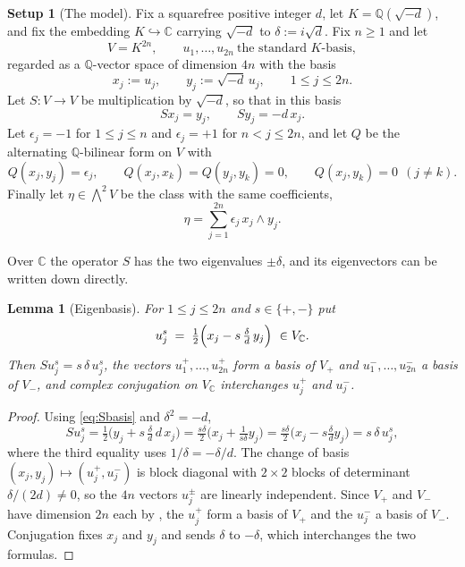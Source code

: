 \documentclass[11pt,reqno]{amsart}
\theoremstyle{plain}
\newtheorem{lemma}[theorem]{Lemma}
\theoremstyle{definition}
\newtheorem{setupenv}[theorem]{Setup}
\theoremstyle{remark}
\newcommand{\QQ}{\mathbb{Q}}
\newcommand{\CC}{\mathbb{C}}
\begin{document}
\begin{setupenv}[The model]\label{setup:model}
Fix a squarefree positive integer $d$, let $K=\QQ(\sqrt{-d})$, and fix the
embedding $K\hookrightarrow\CC$ carrying $\sqrt{-d}$ to $\delta:=i\sqrt{d}$.
Fix $n\ge1$ and let
\[
  V=K^{2n},
  \qquad
  u_{1},\dots,u_{2n}\ \text{the standard $K$-basis},
\]
regarded as a $\QQ$-vector space of dimension $4n$ with the basis
\[
  x_{j}:=u_{j},
  \qquad
  y_{j}:=\sqrt{-d}\,u_{j},
  \qquad 1\le j\le 2n .
\]
Let $S\colon V\to V$ be multiplication by $\sqrt{-d}$, so that in this basis
\begin{equation}\label{eq:Sbasis}
  S x_{j}=y_{j},
  \qquad
  S y_{j}=-d\,x_{j}.
\end{equation}
Let $\epsilon_{j}=-1$ for $1\le j\le n$ and $\epsilon_{j}=+1$ for
$n<j\le 2n$, and let $Q$ be the alternating $\QQ$-bilinear form on $V$ with
\begin{equation}\label{eq:Qbasis}
  Q(x_{j},y_{j})=\epsilon_{j},
  \qquad
  Q(x_{j},x_{k})=Q(y_{j},y_{k})=0,
  \qquad
  Q(x_{j},y_{k})=0 \ \ (j\ne k).
\end{equation}
Finally let $\eta\in\bigwedge^{2}V$ be the class with the same coefficients,
\begin{equation}\label{eq:etabasis}
  \eta=\sum_{j=1}^{2n}\epsilon_{j}\,x_{j}\wedge y_{j}.
\end{equation}
\end{setupenv}

Over $\CC$ the operator $S$ has the two eigenvalues $\pm\delta$, and its
eigenvectors can be written down directly.

\begin{lemma}[Eigenbasis]\label{lem:eigenbasis}
For $1\le j\le2n$ and $s\in\{+,-\}$ put
\begin{equation}\label{eq:eigenvec}
  u_{j}^{s}\;=\;\tfrac12\Bigl(x_{j}-s\,\tfrac{\delta}{d}\,y_{j}\Bigr)
  \ \in V_{\CC}.
\end{equation}
Then $S u_{j}^{s}=s\,\delta\,u_{j}^{s}$, the vectors $u_{1}^{+},\dots,u_{2n}^{+}$
form a basis of $V_{+}$ and $u_{1}^{-},\dots,u_{2n}^{-}$ a basis of $V_{-}$,
and complex conjugation on $V_{\CC}$ interchanges $u_{j}^{+}$ and $u_{j}^{-}$.
\end{lemma}

\begin{proof}
Using \eqref{eq:Sbasis} and $\delta^{2}=-d$,
\[
  S u_{j}^{s}
  =\tfrac12\bigl(y_{j}+s\,\tfrac{\delta}{d}\,d\,x_{j}\bigr)
  =\tfrac{s\delta}{2}\bigl(x_{j}+\tfrac{1}{s\delta}y_{j}\bigr)
  =\tfrac{s\delta}{2}\bigl(x_{j}-s\tfrac{\delta}{d}y_{j}\bigr)
  =s\,\delta\,u_{j}^{s},
\]
where the third equality uses $1/\delta=-\delta/d$. The change of basis
$(x_{j},y_{j})\mapsto(u_{j}^{+},u_{j}^{-})$ is block diagonal with
$2\times2$ blocks of determinant $\delta/(2d)\ne0$, so the $4n$ vectors
$u_{j}^{\pm}$ are linearly independent. Since $V_{+}$ and $V_{-}$ have
dimension $2n$ each by , the $u_{j}^{+}$ form a basis of
$V_{+}$ and the $u_{j}^{-}$ a basis of $V_{-}$. Conjugation fixes $x_{j}$ and
$y_{j}$ and sends $\delta$ to $-\delta$, which interchanges the two formulas.
\end{proof}
\end{document}
